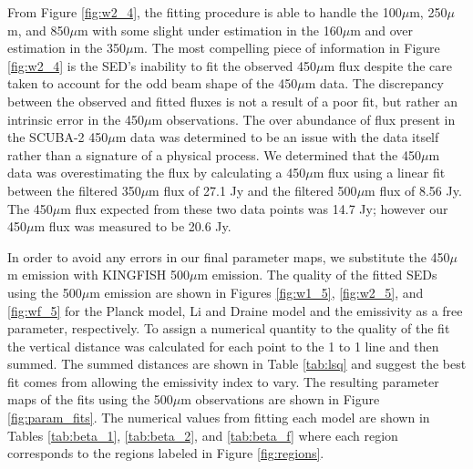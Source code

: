 From Figure \ref{fig:w2_4}, the fitting procedure is able to handle the 100$\mu$m, 250$\mu$m, and 850$\mu$m with some slight under estimation in the 160$\mu$m and over  estimation in the 350$\mu$m.  The most compelling piece of information in Figure \ref{fig:w2_4} is the SED's inability to fit the observed 450$\mu$m flux despite the care taken to account for the odd beam shape of the 450$\mu$m data.  The discrepancy between the observed and fitted fluxes is not a result of a poor fit, but rather an intrinsic error in the 450$\mu$m observations.  The over abundance of flux present in the SCUBA-2 450$\mu$m data was determined to be an issue with the data itself rather than a signature of a physical process.  We determined that the 450$\mu$m data was overestimating the flux by calculating a 450$\mu$m flux using a linear fit between the filtered 350$\mu$m flux of 27.1 Jy and the filtered 500$\mu$m flux of 8.56 Jy.  The 450$\mu$m flux expected from these two data points was 14.7 Jy; however our 450$\mu$m flux was measured to be 20.6 Jy.

In order to avoid any errors in our final parameter maps, we substitute the 450$\mu$m emission with KINGFISH 500$\mu$m emission.  The quality of the fitted SEDs using the 500$\mu$m emission are shown in Figures \ref{fig:w1_5}, \ref{fig:w2_5}, and \ref{fig:wf_5} for the Planck model, Li and Draine model and the emissivity as a free parameter, respectively.  To assign a numerical quantity to the quality of the fit the vertical distance was calculated for each point to the 1 to 1 line and then summed.  The summed distances are shown in Table \ref{tab:lsq} and suggest the best fit comes from allowing the emissivity index to vary.  The resulting parameter maps of the fits using the 500$\mu$m observations are shown in Figure \ref{fig:param_fits}. The numerical values from fitting each model are shown in Tables \ref{tab:beta_1}, \ref{tab:beta_2}, and \ref{tab:beta_f} where each region corresponds to the regions labeled in Figure \ref{fig:regions}.

